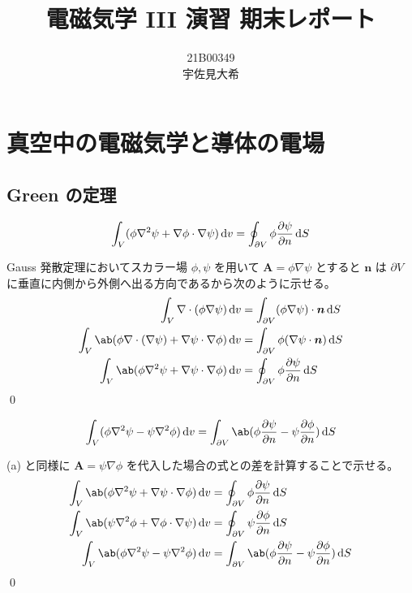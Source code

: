 \documentclass[uplatex,dvipdfmx,a4paper,11pt]{jlreq}
\title{電磁気学 III 演習 期末レポート}
\author{21B00349 \\ 宇佐見大希}
\makeatletter
\newcommand{\laplacian}{\nabla^2}
\numberwithin{equation}{section}
\theoremstyle{definition}
\renewenvironment{proof}[1][\proofname]{\par
  \normalfont
  \topsep6\p@\@plus6\p@ \trivlist
  \item[\hskip\labelsep{\bfseries #1}\@addpunct{\bfseries}]\ignorespaces\quad\par
}{%
  \qed\endtrivlist\@endpefalse
}
\renewcommand\proofname{証明}
\makeatother
\begin{document}
\maketitle
\tableofcontents
\clearpage

\section{真空中の電磁気学と導体の電場}
\setcounter{subsection}{1}
\subsection{Green の定理}
\begin{problem}
\begin{align}
  \int_V(\phi\laplacian\psi + \nabla\phi\cdot\nabla\psi)\dl{v} = \oint_{\partial V}\phi\diffp{\psi}{n}\dl{S}
\end{align}
\end{problem}
\begin{proof}
  Gauss 発散定理においてスカラー場 $\phi, \psi$ を用いて $\bm{A} = \phi\nabla\psi$ とすると $\bm{n}$ は $\partial V$ に垂直に内側から外側へ出る方向であるから次のように示せる。
  \begin{align}
    \int_V\nabla\cdot(\phi\nabla\psi)\dl{v}                                  & = \int_{\partial V}(\phi\nabla\psi)\cdot\bm{n}\dl{S} \\
    \int_V\ab(\phi\nabla\cdot(\nabla\psi) + \nabla\psi\cdot\nabla\phi)\dl{v} & = \int_{\partial V}\phi(\nabla\psi\cdot\bm{n})\dl{S} \\
    \int_V\ab(\phi\laplacian\psi + \nabla\psi\cdot\nabla\phi)\dl{v}          & = \oint_{\partial V}\phi\diffp{\psi}{n}\dl{S}
  \end{align}
\end{proof}

\begin{problem}
\begin{align}
  \int_V(\phi\laplacian\psi - \psi\laplacian\phi)\dl{v} = \int_{\partial V}\ab(\phi\diffp{\psi}{n} - \psi\diffp{\phi}{n})\dl{S}
\end{align}
\end{problem}
\begin{proof}
  (a) と同様に $\bm{A} = \psi\nabla\phi$ を代入した場合の式との差を計算することで示せる。
  \begin{align}
    \int_V\ab(\phi\laplacian\psi + \nabla\psi\cdot\nabla\phi)\dl{v} & = \oint_{\partial V}\phi\diffp{\psi}{n}\dl{S}                           \\
    \int_V\ab(\psi\laplacian\phi + \nabla\phi\cdot\nabla\psi)\dl{v} & = \oint_{\partial V}\psi\diffp{\phi}{n}\dl{S}                           \\
    \int_V\ab(\phi\laplacian\psi - \psi\laplacian\phi)\dl{v}        & = \int_{\partial V}\ab(\phi\diffp{\psi}{n} - \psi\diffp{\phi}{n})\dl{S}
  \end{align}
\end{proof}
\end{document}

